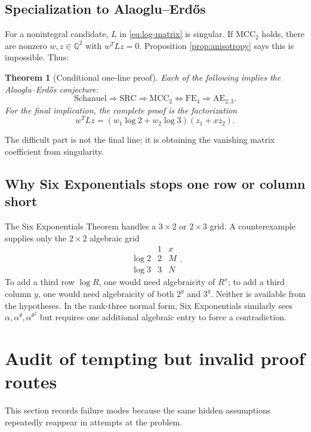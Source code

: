 \documentclass[11pt]{article}
\newtheorem{theorem}{Theorem}[section]
\theoremstyle{definition}
\theoremstyle{remark}
\newcommand{\Q}{\mathbb{Q}}
\newcommand{\FE}{\mathrm{FE}_4}
\newcommand{\MCC}{\mathrm{MCC}_2}
\newcommand{\SRC}{\mathrm{SRC}}
\newcommand{\AEconj}{\mathrm{AE}_{2,3}}
\begin{document}
\subsection{Specialization to Alaoglu--Erd\H{o}s}

For a nonintegral candidate, $L$ in \eqref{eq:log-matrix} is singular.  If $\MCC$ holds,
there are nonzero $w,z\in\Q^2$ with $w^TLz=0$.  Proposition
\ref{prop:anisotropy} says this is impossible.  Thus:

\begin{theorem}[Conditional one-line proof]
\label{thm:conditional-one-line}
Each of the following implies the Alaoglu--Erd\H{o}s conjecture:
\[
 \text{Schanuel}
 \Longrightarrow \SRC
 \Longrightarrow \MCC
 \Longleftrightarrow \FE
 \Longrightarrow \AEconj.
\]
For the final implication, the complete proof is the factorization
\[
 w^TLz=(w_1\log2+w_2\log3)(z_1+xz_2).
\]
\end{theorem}

The difficult part is not the final line; it is obtaining the vanishing matrix coefficient
from singularity.

\subsection{Why Six Exponentials stops one row or column short}

The Six Exponentials Theorem handles a $3\times2$ or $2\times3$ grid.  A counterexample
supplies only the $2\times2$ algebraic grid
\[
 \begin{array}{c|cc}
  &1&x\\ \hline
 \log2&2&M\\
 \log3&3&N
 \end{array}.
\]
To add a third row $\log R$, one would need algebraicity of $R^x$; to add a third column
$y$, one would need algebraicity of both $2^y$ and $3^y$.  Neither is available from the
hypotheses.  In the rank-three normal form, Six Exponentials similarly sees
$\alpha,\alpha^\theta,\alpha^{\theta^2}$ but requires one additional algebraic entry to force
a contradiction.

\section{Audit of tempting but invalid proof routes}
\label{sec:false-proofs}

This section records failure modes because the same hidden assumptions repeatedly reappear in
attempts at the problem.
\end{document}

